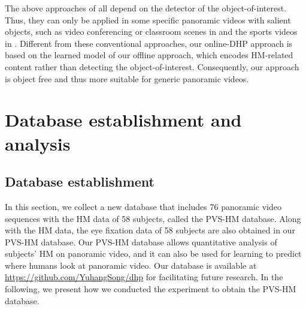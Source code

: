 \documentclass[10pt,journal,compsoc]{IEEEtran}
\begin{document}
The above approaches of \cite{foote2000flycam, sun2005region, su2016pano2vid, hu2017deep, lin2017tell}  all depend on the detector of the object-of-interest. Thus, they can only be applied in some specific panoramic videos with salient objects, such as video conferencing or classroom scenes in \cite{foote2000flycam, sun2005region} and the sports videos in \cite{su2016pano2vid, hu2017deep, lin2017tell}. Different from these conventional approaches, our online-DHP approach is based on the learned model of our offline approach, which encodes HM-related content rather than detecting the object-of-interest. Consequently, our approach is object free and thus more suitable for generic panoramic videos.











\section{Database establishment and analysis}
\label{Database_establishment_and_analysis}

\subsection{Database establishment}
\label{Database_establishment}

In this section, we collect a new database that includes 76 panoramic video sequences with the HM data of 58 subjects, called the PVS-HM database.
Along with the HM data, the eye fixation data of 58 subjects are also obtained in our PVS-HM database.
Our PVS-HM database allows quantitative analysis of subjects' HM on panoramic video, and it can also be used for learning to predict where humans look at panoramic video. Our database is available at  \url{https://github.com/YuhangSong/dhp} for facilitating future research. In the following, we present how we conducted the experiment to obtain the PVS-HM database.
\end{document}
